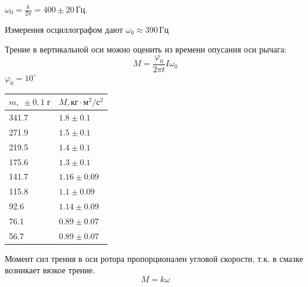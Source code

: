 $\omega_0=\frac{k}{2\pi}=400\pm20\,\text{Гц}$.

Измерения осциллографом дают $\omega_0\approx 390\,\text{Гц}$

Трение в вертикальной оси можно оценить из времени опусания оси рычага:
\[M=\frac{\varphi_0}{2\pi t}I\omega_0\]
$\varphi_0=10^\circ$

\begin{table}[!ht]
    \centering
    \begin{tabular}{|l|l|}
    \hline
        $m,\;\pm 0{,}1\;\text{г}$ & $M,\text{кг}\cdot\text{м}^2/\text{с}^2$\\ \hline
        341.7 & $1.8\pm 0.1$ \\ \hline
        271.9 & $1.5\pm 0.1$ \\ \hline
        219.5 & $1.4\pm 0.1$ \\ \hline
        175.6 & $1.3\pm 0.1$ \\ \hline
        141.7 & $1.16\pm 0.09$\\ \hline
        115.8 & $1.1\pm 0.09$ \\ \hline
        92.6 & $1.14\pm 0.09$ \\ \hline
        76.1 & $0.89\pm 0.07$ \\ \hline
        56.7 & $0.89\pm 0.07$ \\ \hline
    \end{tabular}
\end{table}

Момент сил трения в оси ротора пропорционален угловой скорости, т.к. в смазке
возникает вязкое трение.
\[M=k\omega\]

